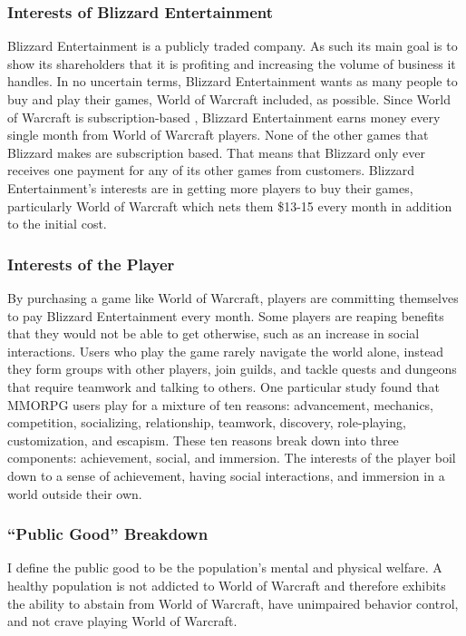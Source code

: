 \documentclass[11pt]{article}
\begin{document}
\begin{multicols}{2}
\subsubsection{Interests of Blizzard Entertainment}
Blizzard Entertainment is a publicly traded company. \cite{BlizzStock} As such its main goal is to show its shareholders that it is profiting and increasing the volume of business it handles. In no uncertain terms, Blizzard Entertainment wants as many people to buy and play their games, World of Warcraft included, as possible. Since World of Warcraft is subscription-based \cite{WoWSubscription}, Blizzard Entertainment earns money every single month from World of Warcraft players. None of the other games that Blizzard makes are subscription based. \cite{BlizzGameList} That means that Blizzard only ever receives one payment for any of its other games from customers. Blizzard Entertainment's interests are in getting more players to buy their games, particularly World of Warcraft which nets them \$13-15 every month in addition to the initial cost. \cite{WoWSubPlans}

\subsubsection{Interests of the Player}
By purchasing a game like World of Warcraft, players are committing themselves to pay Blizzard Entertainment every month. \cite{WoWSubscription} Some players are reaping benefits that they would not be able to get otherwise, such as an increase in social interactions. \cite{IsThereEvidenceOfInternetAddiction} Users who play the game rarely navigate the world alone, instead they form groups with other players, join guilds, and tackle quests and dungeons that require teamwork and talking to others.
One particular study found that MMORPG users play for a mixture of ten reasons: advancement, mechanics, competition, socializing, relationship, teamwork, discovery, role-playing, customization, and escapism. These ten reasons break down into three components: achievement, social, and immersion. \cite{PlayerMotivations} The interests of the player boil down to a sense of achievement, having social interactions, and immersion in a world outside their own.

\subsubsection{``Public Good'' Breakdown}
I define the public good to be the population's mental and physical welfare. A healthy population is not addicted to World of Warcraft and therefore exhibits the ability to abstain from World of Warcraft, have unimpaired behavior control, and not crave playing World of Warcraft.


\end{multicols}
\end{document}
